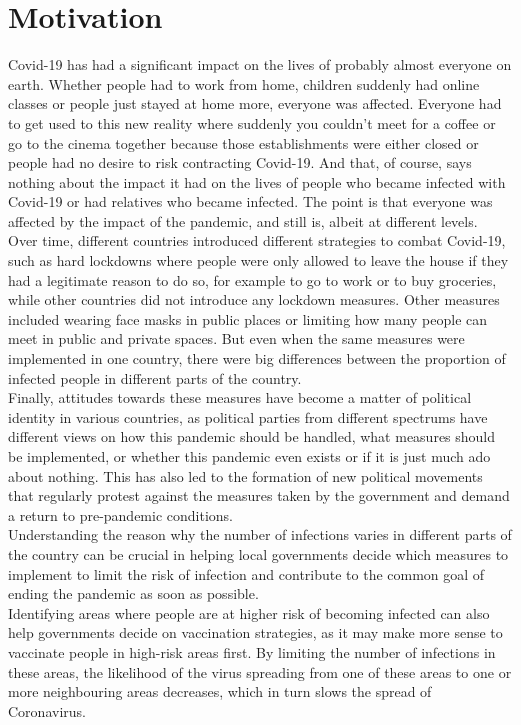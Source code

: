 \section{Motivation}
Covid-19 has had a significant impact on the lives of probably almost everyone on earth. Whether people had to work from home, children suddenly had online classes or people just stayed at home more, everyone was affected. Everyone had to get used to this new reality where suddenly you couldn't meet for a coffee or go to the cinema together because those establishments were either closed or people had no desire to risk contracting Covid-19. And that, of course, says nothing about the impact it had on the lives of people who became infected with Covid-19 or had relatives who became infected. The point is that everyone was affected by the impact of the pandemic, and still is, albeit at different levels. \\
Over time, different countries introduced different strategies to combat Covid-19, such as hard lockdowns where people were only allowed to leave the house if they had a legitimate reason to do so, for example to go to work or to buy groceries, while other countries did not introduce any lockdown measures. Other measures included wearing face masks in public places or limiting how many people can meet in public and private spaces. But even when the same measures were implemented in one country, there were big differences between the proportion of infected people in different parts of the country. \\
Finally, attitudes towards these measures have become a matter of political identity in various countries, as political parties from different spectrums have different views on how this pandemic should be handled, what measures should be implemented, or whether this pandemic even exists or if it is just much ado about nothing. This has also led to the formation of new political movements that regularly protest against the measures taken by the government and demand a return to pre-pandemic conditions. \\
Understanding the reason why the number of infections varies in different parts of the country can be crucial in helping local governments decide which measures to implement to limit the risk of infection and contribute to the common goal of ending the pandemic as soon as possible. \\
Identifying areas where people are at higher risk of becoming infected can also help governments decide on vaccination strategies, as it may make more sense to vaccinate people in high-risk areas first. By limiting the number of infections in these areas, the likelihood of the virus spreading from one of these areas to one or more neighbouring areas decreases, which in turn slows the spread of Coronavirus.
\clearpage
